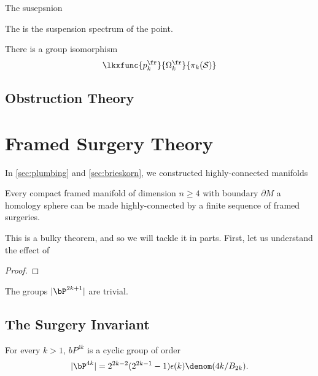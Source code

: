 \begin{definition}
	The susepsnion
\end{definition}

\begin{definition}
	The  is the suspension spectrum of the point.
\end{definition}

\begin{theorem}
	There is a group isomorphism
	\[
		\lkxfunc{p^\fr_k}{\Omega_k^\fr}{\pi_k(\mathcal{S})}
	\]
\end{theorem}

\subsection{Obstruction Theory}

\pagebreak
\section{Framed Surgery Theory}

In \cref{sec:plumbing} and \cref{sec:brieskorn}, we constructed highly-connected manifolds

\begin{theorem}\label{thm:framed-surgery-highly-connected}
	Every compact framed manifold of dimension $n\geq 4$ with boundary $\partial M$ a homology sphere can be made highly-connected by a finite sequence of framed surgeries.
\end{theorem}

This is a bulky theorem, and so we will tackle it in parts. First, let us understand the effect of

\begin{proof}
\end{proof}

\begin{corollary}\label{cor:odd-dimensional-bP-trivial}
	The groups $|\bP^{2k+1}|$ are trivial.
\end{corollary}

\subsection{The Surgery Invariant}\label{sec:surgery-invariant}

\begin{theorem}\label{thm:kervaire-milnor}
	For every $k>1$, $bP^{4k}$ is a cyclic group of order
	\[
		|\bP^{4k}| =2^{2k-2}(2^{2k-1}-1)\epsilon(k)\denom(4k/B_{2k}).
	\]
\end{theorem}


